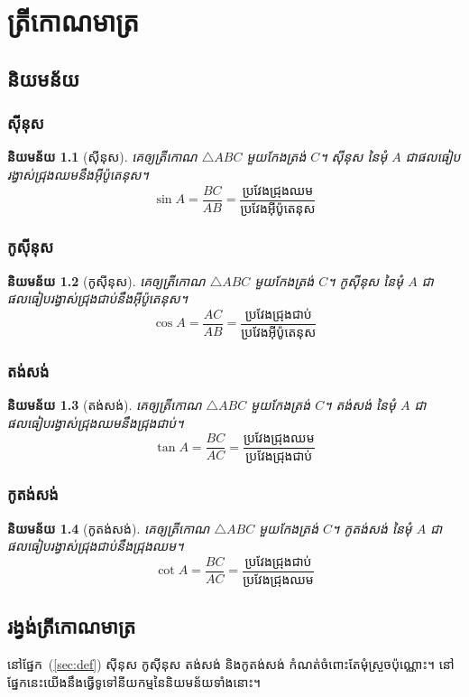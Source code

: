 \documentclass[a4paper,12pt,oneside]{book}
\newtheorem{definition}{និយមន័យ}[chapter]
\begin{document}
	\chapter{ត្រីកោណមាត្រ}
	\section{និយមន័យ\label{sec:def}}
	\subsection{ស៊ីនុស}
	\begin{definition}[ស៊ីនុស]
		គេឲ្យត្រីកោណ $ \triangle ABC $ មួយកែងត្រង់ $ C $។ \emph{ស៊ីនុស} នៃមុំ $ A $ ជាផលធៀបរង្វាស់ជ្រុងឈមនឹងអ៊ីប៉ូតេនុស។
		\[ \sin A=\frac{BC}{AB}=\frac{\text{ប្រវែងជ្រុងឈម}}{\text{ប្រវែងអ៊ីប៉ូតេនុស}} \]
	\end{definition}
	\subsection{កូស៊ីនុស}
	\begin{definition}[កូស៊ីនុស]
		គេឲ្យត្រីកោណ $ \triangle ABC $ មួយកែងត្រង់ $ C $។ \emph{កូស៊ីនុស} នៃមុំ $ A $ ជាផលធៀបរង្វាស់ជ្រុងជាប់នឹងអ៊ីប៉ូតេនុស។
		\[ \cos A=\frac{AC}{AB}=\frac{\text{ប្រវែងជ្រុងជាប់}}{\text{ប្រវែងអ៊ីប៉ូតេនុស}} \]
	\end{definition}
	\subsection{តង់សង់}
	\begin{definition}[តង់សង់]
		គេឲ្យត្រីកោណ $ \triangle ABC $ មួយកែងត្រង់ $ C $។ \emph{តង់សង់} នៃមុំ $ A $ ជាផលធៀបរង្វាស់ជ្រុងឈមនឹងជ្រុងជាប់។
		\[ \tan A=\frac{BC}{AC}=\frac{\text{ប្រវែងជ្រុងឈម}}{\text{ប្រវែងជ្រុងជាប់}} \]
	\end{definition}
	\subsection{កូតង់សង់}
	\begin{definition}[កូតង់សង់]
		គេឲ្យត្រីកោណ $ \triangle ABC $ មួយកែងត្រង់ $ C $។ \emph{កូតង់សង់} នៃមុំ $ A $ ជាផលធៀបរង្វាស់ជ្រុងជាប់នឹងជ្រុងឈម។
		\[ \cot A=\frac{BC}{AC}=\frac{\text{ប្រវែងជ្រុងជាប់}}{\text{ប្រវែងជ្រុងឈម}} \]
	\end{definition}
	\section{រង្វង់ត្រីកោណមាត្រ}
	នៅផ្នែក~(\ref{sec:def}) ស៊ីនុស កូស៊ីនុស តង់សង់ និងកូតង់សង់ កំណត់ចំពោះតែមុំស្រួចប៉ុណ្ណោះ។ នៅផ្នែកនេះយើងនឹងធ្វើទូទៅនីយកម្មនៃនិយមន័យទាំងនោះ។
\end{document}
